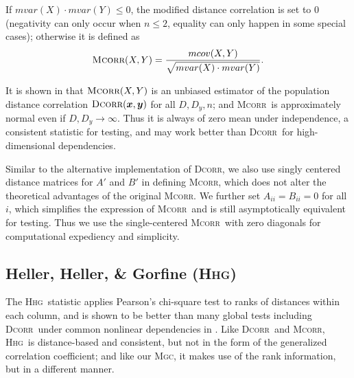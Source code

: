\documentclass[11pt]{article}
\providecommand{\sct}[1]{{\normalfont\textsc{#1}}}
\providecommand{\mb}[1]{\boldsymbol{#1}}
\newcommand{\Mgc}{\sct{Mgc}}
\newcommand{\Hhg}{\sct{Hhg}}
\newcommand{\Dcorr}{\sct{Dcorr}}
\newcommand{\Mcorr}{\sct{Mcorr}}
\begin{document}
If $mvar(X) \cdot mvar(Y) \leq 0$, the modified distance correlation is set to $0$ (negativity can only occur when $n\leq 2$, equality can only happen in some special cases); otherwise it is defined as
\begin{equation*}
\Mcorr(X,Y)=\frac{mcov(X,Y)}{\sqrt{mvar(X) \cdot mvar(Y)}}.
\end{equation*}

It is shown in \cite{SzekelyRizzo2013a} that $\Mcorr(X,Y)$ is an unbiased estimator of the population distance correlation $\Dcorr(\mb{x},\mb{y})$ for all $D, D_y, n$; and \Mcorr~is approximately normal even if $D,D_y \rightarrow \infty$. Thus it is always of zero mean under independence, a consistent statistic for testing, and may work better than \Dcorr~for high-dimensional dependencies.

Similar to the alternative implementation of \Dcorr, we also use singly centered distance matrices for $A'$ and $B'$ in defining \Mcorr, which does not alter the theoretical advantages of the original \Mcorr. We further set $A_{ii}=B_{ii}=0$ for all $i$, which simplifies the expression of \Mcorr~and is still asymptotically equivalent for testing. 
Thus we use the single-centered \Mcorr~with zero diagonals for computational expediency and simplicity.


\subsection{Heller, Heller, \& Gorfine (\Hhg)}
\label{appen:hhg}

The \Hhg~statistic applies Pearson's chi-square test to ranks of distances within each column, and is shown to be better than many global tests including \Dcorr~under common nonlinear dependencies in \cite{GorfineHellerHeller2012, HellerGorfine2013}. Like \Dcorr~and \Mcorr, \Hhg~is distance-based and consistent, but not in the form of the generalized correlation coefficient; and like our \Mgc, it makes use of the rank information, but in a different manner.
\end{document}
